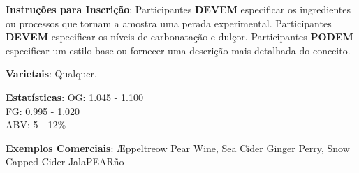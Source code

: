 \textbf{Instruções para Inscrição}: Participantes \textbf{DEVEM} especificar os ingredientes ou processos que tornam a amostra uma perada experimental. Participantes \textbf{DEVEM} especificar os níveis de carbonatação e dulçor. Participantes \textbf{PODEM} especificar um estilo-base ou fornecer uma descrição mais detalhada do conceito.

\textbf{Varietais}: Qualquer.

\textbf{Estatísticas}: OG: 1.045 - 1.100 \\
\phantom{ } \hspace{16.5mm} FG: 0.995 - 1.020 \\
\phantom{ } \hspace{16.5mm} ABV: 5 - 12\%

\textbf{Exemplos Comerciais}: Æppeltreow Pear Wine, Sea Cider Ginger Perry, Snow Capped Cider JalaPEARño
